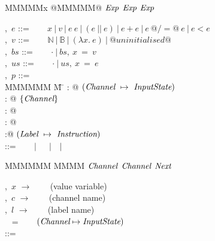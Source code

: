 
\begin{figure}
\begin{center}
\begin{minipage}[t]{0.4\textwidth}
\begin{tabbing}
MMMMMx \TABDEF @MMMMM@  \TABSKIP $\textit{Exp}$ \TABSKIP $\textit{Exp}$ \TABSKIP $\textit{Exp}$ \kill

\Exp,~$e$       \> ::= \> ~~~ $x~|~v~|~e~e ~|~ (e~||~e) ~|~ e+e ~|~ e~@/=@~e ~|~ e < e$ \\
\Value,~$v$     \> ::= \> ~~~ $\mathbb{N}~|~\mathbb{B}~|~(\lambda{}x.~e)~|~@uninitialised@$ \\
\Heap,~$bs$     \> ::= \> ~~~ $\cdot~|~bs,~x~=~v$ \\
\Updates,~$us$  \> ::= \> ~~~ $\cdot~|~us,~x~=~e$
\\[0.5em]

\Proc,~$p$      \> ::=\> \lstiproc@process@ \\
MMMMMM \= M \= \kill
\> \> \lstiproc@ins:   @  $(\textit{Channel} ~\mapsto~ \textit{InputState})$ \\
\> \> \lstiproc@outs:  @  $\{ \textit{Channel} \}$ \\
\> \> \lstiproc@heap:  @  \Heap \\
\> \> \lstiproc@label: @  \Label \\
\> \> \lstiproc@instrs:@  $(\textit{Label} ~\mapsto~ \textit{Instruction})$ 
\\[0.5em]
\InputState \> ::= \> ~~ \lstiproc@none@~$|$~\lstiproc@pending@~\Value~$|$~\lstiproc@have@~$|$~\lstiproc@closed@
\end{tabbing}

\begin{tabbing}
MMMMMM \TABDEF MMMM \TABSKIP $\textit{Channel}$ \TABSKIP $\textit{Channel}$ \TABSKIP $\textit{Next}$ \TABSKIP \kill

\Var,~$x$       \> $\to$ \> ~~~ (value variable) \\
\Chan,~$c$      \> $\to$ \> ~~~ (channel name) \\
\Label,~$l$     \> $\to$ \> ~~~ (label name) \\ 
\ChannelStates  \> ~ =   \> ~~~ $(\textit{Channel} \mapsto \textit{InputState})$ \\[0.5em]

\Instr
    \> ::=\> \lstiproc@pull@  \> \Chan  \> \Var  \> \Next \> \Next \\
    \TABALT  \lstiproc@push@  \> \Chan  \> \Exp  \> \Next \\
    \TABALT  \lstiproc@close@ \> \Chan  \>       \> \Next \\
    \TABALT  \lstiproc@drop@  \> \Chan  \>       \> \Next \\
    \TABALT  \lstiproc@case@  \> \Exp   \> \Next \> \Next \\
    \TABALT  \lstiproc@jump@  \>        \>       \> \Next \\
    \TABALT  \lstiproc@exit@  \\
\\[0.5em]


\end{tabbing}
\end{minipage}
\end{center}
\end{figure}
